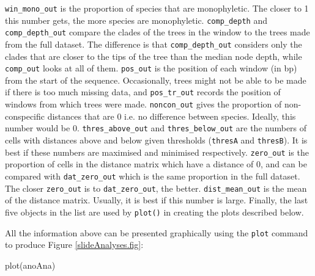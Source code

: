 \documentclass{article}
\newcommand{\fun}[1]{\texttt{#1}}
\begin{document}
\verb|win_mono_out| is the proportion of species that are monophyletic. The closer to 1 this number gets, the more species are monophyletic.
\verb|comp_depth| and \verb|comp_depth_out| compare the clades of the trees in the window to the trees made from the full dataset. The difference is that \verb|comp_depth_out| considers only the clades that are closer to the tips of the tree than the median node depth, while \verb|comp_out| looks at all of them.
\verb|pos_out| is the position of each window (in bp) from the start of the sequence. Occasionally, trees might not be able to be made if there is too much missing data, and \verb|pos_tr_out| records the position of windows from which trees were made.
\verb|noncon_out| gives the proportion of non-conspecific distances that are 0 i.e. no difference between species. Ideally, this number would be 0.
\verb|thres_above_out| and \verb|thres_below_out| are the numbers of cells with distances above and below given thresholds (\verb|thresA| and \verb|thresB|). It is best if these numbers are maximised and minimised respectively.
\verb|zero_out| is the proportion of cells in the distance matrix which have a distance of 0, and can be compared with \verb|dat_zero_out| which is the same proportion in the full dataset. The closer \verb|zero_out| is to \verb|dat_zero_out|, the better.
\verb|dist_mean_out| is the mean of the distance matrix. Usually, it is best if this number is large.
Finally, the last five objects in the list are used by \fun{plot()} in creating the plots  described below.

All the information above can be presented graphically using the \fun{plot} command to produce Figure \ref{slideAnalyses.fig}:

\begin{console}
plot(anoAna)
\end{console}
\end{document}
